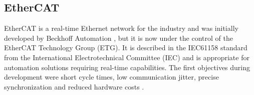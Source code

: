 \subsection{EtherCAT} \label{sec:ethercat}

EtherCAT is a real-time Ethernet network for the industry and was initially developed by Beckhoff Automation \cite{misc:beckhoff}, but it is now under the control of the EtherCAT Technology Group (ETG).
It is described in the IEC61158 standard from the International Electrotechnical Committee (IEC) and is appropriate for automation solutions requiring real-time capabilities.
The first objectives during development were short cycle times, low communication jitter, precise synchronization and reduced hardware costs \cite{protocol:ethercat}.










